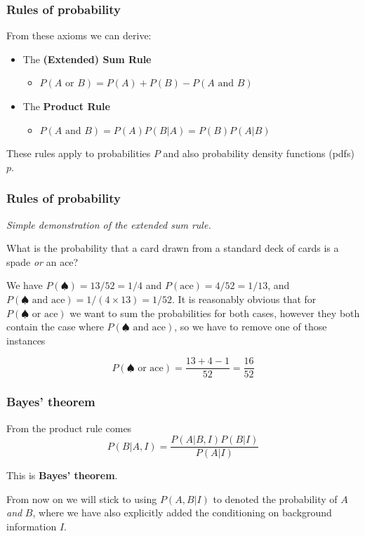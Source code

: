 \begin{frame}

\frametitle{Rules of probability}
\label{rulesofprobability}

From these axioms we can derive:

\begin{itemize}
\item The \textbf{(Extended) Sum Rule}

\begin{itemize}
\item $P(A\text{ or }B) = P(A) + P(B) - P(A\text{ and }B)$

\end{itemize}

\item The \textbf{Product Rule}

\begin{itemize}
\item $P(A\text{ and }B) = P(A)P(B|A) = P(B)P(A|B)$

\end{itemize}

\end{itemize}

These rules apply to probabilities $P$ and also probability density functions (pdfs) $p$.

\end{frame}

\begin{frame}

\frametitle{Rules of probability}
\label{rulesofprobability}

\emph{Simple demonstration of the extended sum rule.}

What is the probability that a card drawn from a standard deck of cards is a spade \emph{or} an ace?

We have $P(\spadesuit) = 13/52 = 1/4$ and $P(\text{ace}) = 4/52 = 1/13$, and $P(\spadesuit\text{ 
and ace}) = 1/(4\times 13) = 1/52$. It is reasonably obvious that for $P(\spadesuit\text{ or ace})$
we want to sum the probabilities for both cases, however they both contain the case where
$P(\spadesuit\text{ and ace})$, so we have to remove one of those instances

\[
P(\spadesuit\text{ or ace}) = \frac{13 + 4 - 1}{52} = \frac{16}{52}
\]

\end{frame}

\begin{frame}

\frametitle{Bayes' theorem}
\label{bayestheorem}

From the product rule comes
\[
    \boxed{P(B|A,I) = \frac{P(A|B,I)P(B|I)}{P(A|I)}}
\]

This is {\color{red} {\bf Bayes' theorem}}.

From now on we will stick to using $P(A,B|I)$ to denoted the
probability of $A$ \emph{and} $B$, where we have also explicitly added the conditioning on background
information $I$.

\end{frame}

